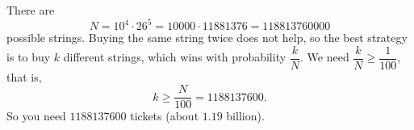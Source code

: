 There are
\[N=10^4\cdot26^5=10000\cdot11881376=118813760000\]
possible strings. Buying the same string twice does not help, so the best strategy is to buy $k$ different strings, which wins with probability $\dfrac kN$. We need $\dfrac kN\ge\dfrac1{100}$, that is,
\[k\ge\dfrac{N}{100}=1188137600.\]
So you need $\boxed{1188137600}$ tickets (about $1.19$ billion).
